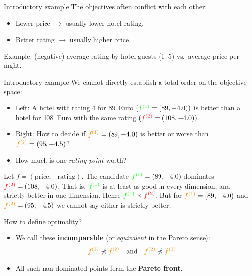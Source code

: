\documentclass[11pt,compress,t,notes=noshow,xcolor=table]{beamer}
\begin{document}
\begin{framev}{Introductory example}
The objectives often conflict with each other:
\begin{itemize}
\item Lower price $\to$ usually lower hotel rating.
\item Better rating $\to$ usually higher price.
\end{itemize}
Example: (negative) average rating by hotel guests (1--5) vs.\ average price per night.
\spacer
{}
\end{framev}

\begin{framev}[fs=footnotesize]{Introductory example}
We cannot directly establish a total order on the objective space:
\begin{itemize}
\item Left: A hotel with rating 4 for 89~Euro
$(\textcolor{green}{f^{(1)}} = (89, -4.0))$
is better than a hotel for 108~Euro with the same rating
$(\textcolor{red}{f^{(2)}} = (108, -4.0))$.
\item Right: How to decide if
$\textcolor{orange}{f^{(1)}}=(89, -4.0)$ is better or worse than
$\textcolor{orange}{f^{(2)}}=(95, -4.5)$?
\item How much is one \emph{rating point} worth?
\end{itemize}
\spacer
Let $f = (\text{price}, -\text{rating})$. The candidate
$\textcolor{green}{f^{(1)}}=(89,-4.0)$
dominates
$\textcolor{red}{f^{(2)}}=(108,-4.0)$.
That is, $\textcolor{green}{f^{(1)}}$ is at least as good
in every dimension, and strictly better in one dimension.
Hence $\textcolor{green}{f^{(1)}} \prec \textcolor{red}{f^{(2)}}$. But for
$\textcolor{orange}{f^{(1)}}=(89,-4.0)$ and $\textcolor{orange}{f^{(2)}}=(95,-4.5)$
we cannot say either is strictly better.
\end{framev}


\begin{framev}{How to define optimality?}
\begin{itemize}\setlength{\itemsep}{0.1em}
\item We call these \textbf{incomparable} (or \emph{equivalent} in the Pareto sense):
$$
\textcolor{orange}{f^{(1)}}
\not\prec
\textcolor{orange}{f^{(2)}}
\quad\text{and}\quad
\textcolor{orange}{f^{(2)}}
\not\prec
\textcolor{orange}{f^{(1)}}.
$$
\item All such non-dominated points form the \textbf{Pareto front}.
\end{itemize}
\spacer
{}
\end{framev}
\end{document}
